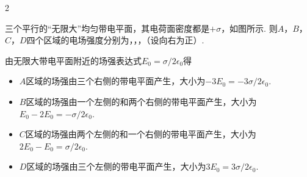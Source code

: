 \begin{paracol}{2}
\begin{problem}
    三个平行的“无限大”均匀带电平面，其电荷面密度都是$+\sigma$，如图所示. 则$A$，$B$，$C$，$D$四个区域的电场强度分别为，，，（设向右为正）.
    \switchcolumn\centering
\end{problem}
\end{paracol}
\begin{solution}
    由无限大带电平面附近的场强表达式$E_0=\sigma/2\epsilon_0$得
\begin{itemize}
    \item $A$区域的场强由三个右侧的带电平面产生，大小为$-3E_0=-3\sigma/2\epsilon_0$.
    \item $B$区域的场强由一个左侧的和两个右侧的带电平面产生，大小为$E_0-2E_0=-\sigma/2\epsilon_0$.
    \item $C$区域的场强由两个左侧的和一个右侧的带电平面产生，大小为$2E_0-E_0=\sigma/2\epsilon_0$.
    \item $D$区域的场强由三个左侧的带电平面产生，大小为$3E_0=3\sigma/2\epsilon_0$.
\end{itemize}
\end{solution}

